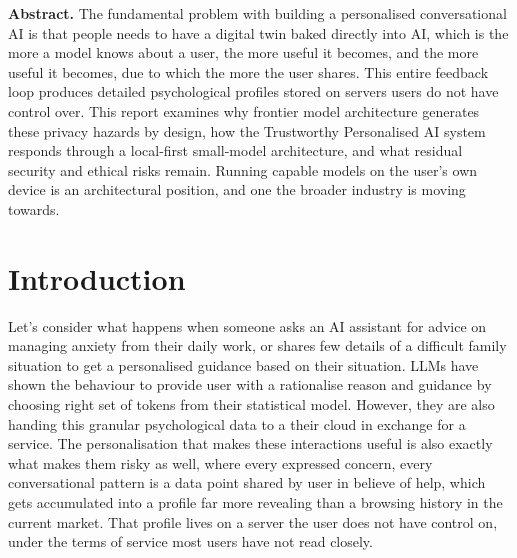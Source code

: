 \documentclass[11pt,a4paper]{article}
\begin{document}


\large\textbf{Abstract.}
\small The fundamental problem with building a personalised conversational AI is that people needs to have a digital twin baked directly into AI, which is the more a model knows about a user, the more useful it becomes, and the more useful it becomes, due to which the more the user shares. This entire feedback loop produces detailed psychological profiles stored on servers users do not have control over. This report examines why frontier model architecture generates these privacy hazards by design, how the Trustworthy Personalised AI system responds through a local-first small-model architecture, and what residual security and ethical risks remain. Running capable models on the user's own device is an architectural position, and one the broader industry is moving towards.

\section{Introduction}
\label{sec:intro}

Let's consider what happens when someone asks an AI assistant for advice on managing anxiety from their daily work, or shares few details of a difficult family situation to get a personalised guidance based on their situation. LLMs have shown the behaviour to provide user with a rationalise reason and guidance by choosing right set of tokens from their statistical model. However, they are also handing this granular psychological data to a their cloud in exchange for a service. The personalisation that makes these interactions useful is also exactly what makes them risky as well, where every expressed concern, every conversational pattern is a data point shared by user in believe of help, which gets accumulated into a profile far more revealing than a browsing history in the current market. That profile lives on a server the user does not have control on, under the terms of service most users have not read closely.
\end{document}
